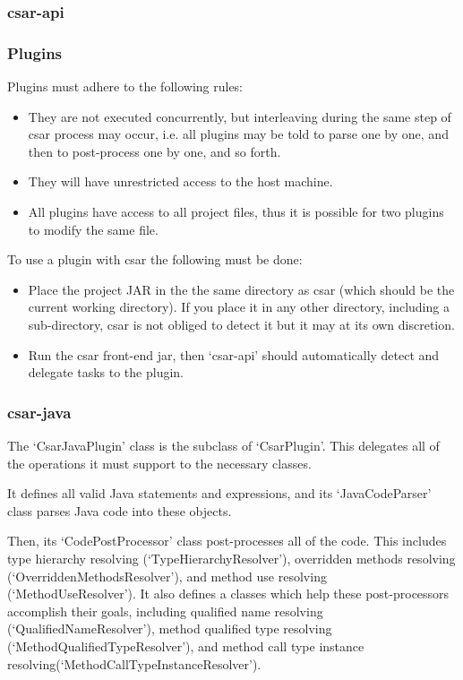 \documentclass[12pt, letterpaper]{article}
\begin{document}
\subsubsection{csar-api}

\subsubsection{Plugins}
Plugins must adhere to the following rules:
\begin{itemize}
  \item They are not executed concurrently, but interleaving during the same step of csar process may occur, i.e. all plugins may be told to parse one by one, and then to post-process one by one, and so forth.
  \item They will have unrestricted access to the host machine.
  \item All plugins have access to all project files, thus it is possible for two plugins to modify the same file.
\end{itemize}

To use a plugin with csar the following must be done:
\begin{itemize}
  \item Place the project JAR in the the same directory as csar (which should be the current working directory).
  If you place it in any other directory, including a sub-directory, csar is not obliged to detect it but it may at its own discretion.
  \item Run the csar front-end jar, then `csar-api' should automatically detect and delegate tasks to the plugin.
\end{itemize}

\subsubsection{csar-java}
The `CsarJavaPlugin' class is the subclass of `CsarPlugin'.
This delegates all of the operations it must support to the necessary classes.

It defines all valid Java statements and expressions, and its `JavaCodeParser' class parses Java code into these objects.

Then, its `CodePostProcessor' class post-processes all of the code.
This includes type hierarchy resolving (`TypeHierarchyResolver'), overridden methods resolving (`OverriddenMethodsResolver'), and method use resolving (`MethodUseResolver').
It also defines a classes which help these post-processors accomplish their goals, including qualified name resolving (`QualifiedNameResolver'), method qualified type resolving (`MethodQualifiedTypeResolver'), and method call type instance resolving(`MethodCallTypeInstanceResolver').
\end{document}
